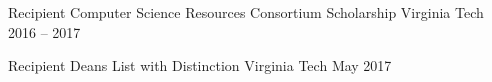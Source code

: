 

\begin{cvhonors}

  \cvhonor
    {Recipient} %
    {Computer Science Resources Consortium Scholarship} %
    {Virginia Tech} %
    {2016 – 2017} %

  \cvhonor
    {Recipient} %
    {Deans List with Distinction} %
    {Virginia Tech} %
    {May 2017} %

\end{cvhonors}
